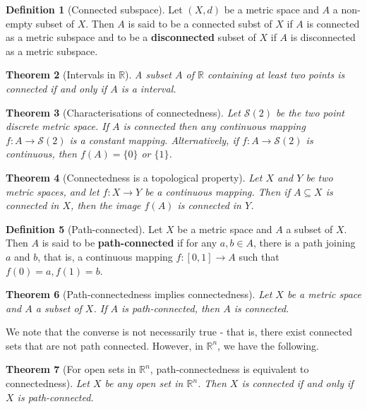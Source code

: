 \documentclass[10pt, oneside, reqno]{amsart}
\theoremstyle{plain}%
\newtheorem{thm}{Theorem}[section]
\theoremstyle{definition}
\newtheorem{defn}[thm]{Definition}
\theoremstyle{remark}
\newcommand{\R}{\mathbb{R}}
\newcommand{\met}{(X,d)}
\begin{document}
\begin{defn}[Connected subspace]
    Let $\met$ be a metric space and $A$ a non-empty subset of $X$.  Then $A$ is said to be a connected subst of $X$ if $A$ is connected as a metric subspace and to be a \textbf{disconnected} subset of $X$ if $A$ is disconnected as a metric subspace.
\end{defn}

\begin{thm}[Intervals in $\R$]
    A subset $A$ of $\R$ containing at least two points is connected if and only if $A$ is a interval.
\end{thm}

\begin{thm}[Characterisations of connectedness]
    Let $\mathcal{S}(2)$ be the two point discrete metric space.
    If $A$ is connected then any continuous mapping $f: A \rightarrow \mathcal{S}(2)$ is a constant mapping.  Alternatively, if $f : A \rightarrow \mathcal{S}(2)$ is continuous, then $f(A) = \{0\}$ or $\{1\}$.
\end{thm}

\begin{thm}[Connectedness is a topological property]
    Let $X$ and $Y$ be two metric spaces, and let $f: X \rightarrow Y$ be a continuous mapping.  Then if $A \subseteq X$ is connected in $X$, then the image $f(A)$ is connected in $Y$.
\end{thm}


\begin{defn}[Path-connected]
    Let $X$ be a metric space and $A$ a subset of $X$. Then $A$ is said to be \textbf{path-connected} if for any $a,b \in A$, there is a path joining $a$ and $b$, that is, a continuous mapping $f: [0,1] \rightarrow A$ such that $f(0) = a, f(1) = b$.
\end{defn}



\begin{thm}[Path-connectedness implies connectedness]
    Let $X$ be a metric space and $A$ a subset of $X$.  If $A$ is path-connected, then $A$ is connected. 
\end{thm}
We note that the converse is not necessarily true - that is, there exist connected sets that are not path connected.  However, in $\R^n$, we have the following.

\begin{thm}[For open sets in $\R^n$, path-connectedness is equivalent to connectedness]
    Let $X$ be any open set in $\R^n$.  Then $X$ is connected if and only if $X$ is path-connected.
\end{thm}
\end{document}
